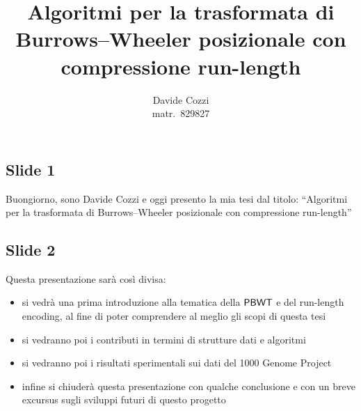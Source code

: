 \documentclass[a4paper,11pt, oneside,italian]{article}
\title{Algoritmi per la trasformata di Burrows--Wheeler
  posizionale con compressione run-length}
\author{Davide Cozzi\\\smaller matr.~829827}
\date{}
\def\PBWT{\mbox{\rm {\sf PBWT}}}
\begin{document}
\maketitle
{}
\noindent
\subsection*{Slide 1}
Buongiorno, sono Davide Cozzi e oggi presento la mia tesi dal titolo:
``Algoritmi per la trasformata di Burrows--Wheeler posizionale con
compressione run-length''
\subsection*{Slide 2}
Questa presentazione sarà così divisa:
\begin{itemize}
  \item si vedrà una prima introduzione alla tematica della $\PBWT$ e del
  run-length encoding, al fine di poter comprendere al meglio gli scopi di
  questa tesi
  \item si vedranno poi i contributi in termini di strutture dati e algoritmi
  \item si vedranno poi i risultati sperimentali sui dati del 1000 Genome
  Project
  \item infine si chiuderà questa presentazione con qualche conclusione e con un
  breve excursus sugli sviluppi futuri di questo progetto
\end{itemize}
\end{document}
